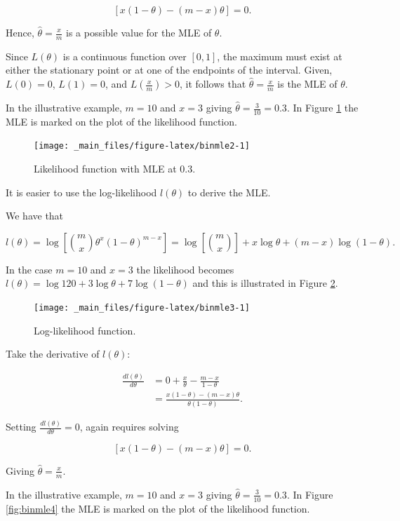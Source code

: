 \documentclass[
]{book}
\begin{document}
\[\left[ x(1-\theta) - (m-x)\theta \right] = 0.\]

Hence, \(\hat{\theta} = \frac{x}{m}\) is a possible value for the MLE of \(\theta\).

Since \(L(\theta)\) is a continuous function over \([0,1]\), the maximum must exist at either the stationary point or at one of the endpoints of the interval. Given, \(L(0) = 0\), \(L(1) = 0\), and \(L\left(\frac{x}{m}\right)>0\), it follows that \(\hat{\theta}=\frac{x}{m}\) is the MLE of \(\theta.\)

In the illustrative example, \(m=10\) and \(x=3\) giving \(\hat{\theta} = \frac{3}{10} =0.3\). In Figure \ref{fig:binmle2} the MLE is marked on the plot of the likelihood function.

\begin{figure}
\texttt{[image: \_main\_files/figure-latex/binmle2-1]} \caption{Likelihood function with MLE at 0.3.}\label{fig:binmle2}
\end{figure}

It is easier to use the log-likelihood \(l(\theta)\) to derive the MLE.

We have that

\[l(\theta) = \log \left[ \binom{m}{x} \theta^x (1-\theta)^{m-x} \right] = \log \left[ \binom{m}{x}\right] + x \log \theta + (m-x) \log (1-\theta).\]

In the case \(m=10\) and \(x=3\) the likelihood becomes \(l(\theta) = \log 120 + 3 \log \theta + 7 \log (1-\theta)\) and this is illustrated in Figure \ref{fig:binmle3}.

\begin{figure}
\texttt{[image: \_main\_files/figure-latex/binmle3-1]} \caption{Log-likelihood function.}\label{fig:binmle3}
\end{figure}

Take the derivative of \(l(\theta)\):

\begin{align*}
\frac{d l(\theta)}{d\theta} &= 0 +\frac{x}{\theta} - \frac{m-x}{1-\theta} \\[3pt]
&= \frac{x (1-\theta) - (m-x) \theta}{\theta (1-\theta)}.
\end{align*}

Setting \(\frac{d l(\theta)}{d\theta} = 0\), again requires solving

\[\left[ x(1-\theta) - (m-x)\theta \right] = 0.\]

Giving \(\hat{\theta} = \frac{x}{m}\).

In the illustrative example, \(m=10\) and \(x=3\) giving \(\hat{\theta} = \frac{3}{10} =0.3\). In Figure \ref{fig:binmle4} the MLE is marked on the plot of the likelihood function.
\end{document}
